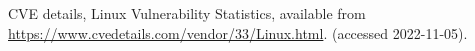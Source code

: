 \documentclass[paper]{ieice}
\begin{document}
\begin{thebibliography}{99}
  CVE details, Linux Vulnerability Statistics, available from \url{https://www.cvedetails.com/vendor/33/Linux.html}. (accessed 2022-11-05).


\end{thebibliography}
%


\vspace{-10.0ex}

\end{document}
